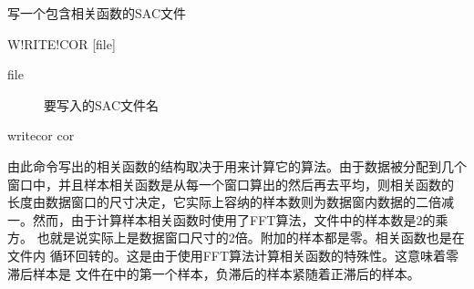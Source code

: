 \label{spe:writecor}

写一个包含相关函数的SAC文件

\begin{SACSTX}
W!RITE!COR [file]
\end{SACSTX}

\begin{description}
\item [file] 要写入的SAC文件名
\end{description}

\begin{SACDFT}
writecor cor
\end{SACDFT}

由此命令写出的相关函数的结构取决于用来计算它的算法。由于数据被分配到几个
窗口中，并且样本相关函数是从每一个窗口算出的然后再去平均，则相关函数的
长度由数据窗口的尺寸决定，它实际上容纳的样本数则为数据窗内数据的二倍减
一。然而，由于计算样本相关函数时使用了FFT算法，文件中的样本数是2的乘方。
也就是说实际上是数据窗口尺寸的2倍。附加的样本都是零。相关函数也是在文件内
循环回转的。这是由于使用FFT算法计算相关函数的特殊性。这意味着零滞后样本是
文件在中的第一个样本，负滞后的样本紧随着正滞后的样本。
